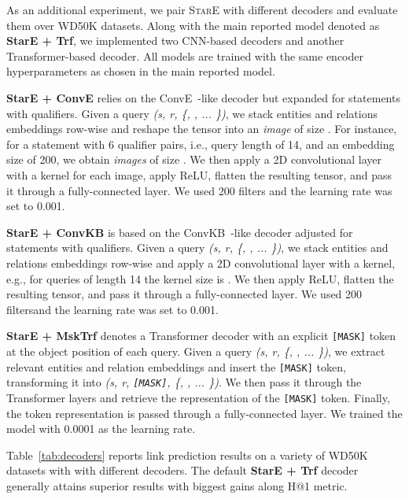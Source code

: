 \documentclass[11pt,a4paper]{article}
\begin{document}
As an additional experiment, we pair \textsc{StarE} with different decoders and evaluate them over
WD50K datasets. 
Along with the main reported model denoted as \textbf{StarE + Trf}, we implemented two CNN-based decoders and another Transformer-based decoder. 
All models are trained with the same encoder hyperparameters as chosen in the main reported model.

\textbf{StarE + ConvE} relies on the ConvE~\citep{DBLP:conf/aaai/DettmersMS018}-like decoder but expanded for statements with qualifiers. 
Given a query \textit{(s, r, \{,  , ... \})}, we stack entities and relations embeddings row-wise and reshape the tensor into an \emph{image} of size . 
For instance, for a statement with 6 qualifier pairs, i.e., query length of 14, and an embedding size of 200, we obtain \emph{images} of size . 
We then apply a 2D convolutional layer with a  kernel for each image, apply ReLU, flatten the resulting tensor, and pass it through a fully-connected layer. 
We used 200 filters and the learning rate was set to 0.001. 

\textbf{StarE + ConvKB} is based on the ConvKB~\citep{DBLP:conf/naacl/NguyenNNP18}-like decoder adjusted for statements with qualifiers.
Given a query \textit{(s, r, \{,  , ... \})}, we stack entities and relations embeddings row-wise and apply a 2D convolutional layer with a  kernel, e.g., for queries of length 14 the kernel size is . 
We then apply ReLU, flatten the resulting tensor, and pass it through a fully-connected layer.
We used 200 filtersand the learning rate was set to 0.001.



\textbf{StarE + MskTrf} denotes a Transformer decoder with an explicit \texttt{[MASK]} token at the object position of each query.
Given a query \textit{(s, r, \{,  , ... \})}, we extract relevant entities and relation embeddings and insert the \texttt{[MASK]} token, transforming it into \textit{(s, r, \texttt{[MASK]}, \{,  , ... \})}.
We then pass it through the Transformer layers and retrieve the  representation of the \texttt{[MASK]} token. 
Finally, the token representation is passed through a fully-connected layer.
We trained the model with 0.0001 as the learning rate.

Table~\ref{tab:decoders} reports link prediction results on a variety of WD50K datasets with with different decoders. 
The default \textbf{StarE + Trf} decoder generally attains superior results with biggest gains along H@1 metric. 
\end{document}
